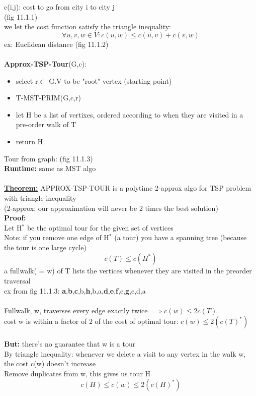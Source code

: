 \documentclass{article}
\begin{document}
	c(i,j): cost to go from city i to city j\\
	(fig 11.1.1)\\
	we let the cost function satisfy the triangle inequality:
	$$\forall u,v,w\in V: c(u,w)\le c(u,v) + c(v,w)$$
	ex: Euclidean distance (fig 11.1.2)\\\\
	\textbf{Approx-TSP-Tour}(G,c):
	\begin{itemize}
		\item select r$\in$ G.V	to be "root" vertex (starting point)
		\item T-MST-PRIM(G,c,r)
		\item let H be a list of vertixes, ordered according to when they are visited in a pre-order walk of T
		\item return H
	\end{itemize}
	Tour from graph: (fig 11.1.3)\\
	\textbf{Runtime:} same as MST algo\\\\
	\textbf{\underline{Theorem:}} APPROX-TSP-TOUR is a polytime 2-approx algo for TSP problem with triangle inequality\\
	(2-approx: our approximation will never be 2 times the best solution)\\
	\textbf{Proof:}\\
	Let H$^*$ be the optimal tour for the given set of vertices\\
	Note: if you remove one edge of H$^*$ (a tour) you have a spanning tree (because the tour is one large cycle)\\
	$$c(T) \le c(H^*)$$
	a fullwalk( = w) of T lists the vertices whenever they are visited in the preorder traversal\\
	ex from fig 11.1.3: \textbf{a},\textbf{b},\textbf{c},b,\textbf{h},b,a,\textbf{d},\textbf{e},\textbf{f},e,\textbf{g},e,d,a\\\\
	Fullwalk, w, traverses every edge exactly twice $\implies c(w) \le 2c(T)$\\
	cost w is within a factor of 2 of the cost of optimal tour: $c(w)\le 2(c(T)^*)$\\\\
	\textbf{But:} there's no guarantee that w is a tour\\
	By triangle inequality: whenever we delete a visit to any vertex in the walk w, the cost c(w) doesn't increase\\
	Remove duplicates from w, this gives us tour H
	$$c(H)\le c(w)\le 2(c(H)^*)$$
\end{document}
